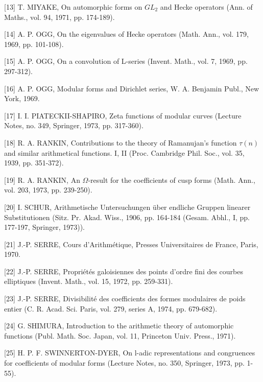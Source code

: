 \documentclass[10pt,oneside]{article}
\begin{document}
[13] T. MIYAKE, On automorphic forms on \(GL_2\) and Hecke operators (Ann. of Maths., vol. 94, 1971, pp. 174-189).\par

[14] A. P. OGG, On the eigenvalues of Hecke operators (Math. Ann., vol. 179, 1969, pp. 101-108).\par

[15] A. P. OGG, On a convolution of L-series (Invent. Math., vol. 7, 1969, pp. 297-312).\par

[16] A. P. OGG, Modular forms and Dirichlet series, W. A. Benjamin Publ., New York, 1969.\par

[17] I. I. PIATECKII-SHAPIRO, Zeta functions of modular curves (Lecture Notes, no. 349, Springer, 1973, pp. 317-360).\par

[18] R. A. RANKIN, Contributions to the theory of Ramanujan's function \(\tau(n)\) and similar arithmetical functions. I, II (Proc. Cambridge Phil. Soc., vol. 35, 1939, pp. 351-372).\par

[19] R. A. RANKIN, An \(\Omega\)-result for the coefficients of cusp forms (Math. Ann., vol. 203, 1973, pp. 239-250).\par

[20] I. SCHUR, Arithmetische Untersuchungen über endliche Gruppen linearer Substitutionen (Sitz. Pr. Akad. Wiss., 1906, pp. 164-184 (Gesam. Abhl., I, pp. 177-197, Springer, 1973)).\par

[21] J.-P. SERRE, Cours d'Arithmétique, Presses Universitaires de France, Paris, 1970.\par

[22] J.-P. SERRE, Propriétés galoisiennes des points d'ordre fini des courbes elliptiques (Invent. Math., vol. 15, 1972, pp. 259-331).\par

[23] J.-P. SERRE, Divisibilité des coefficients des formes modulaires de poids entier (C. R. Acad. Sci. Paris, vol. 279, series A, 1974, pp. 679-682).\par

[24] G. SHIMURA, Introduction to the arithmetic theory of automorphic functions (Publ. Math. Soc. Japan, vol. 11, Princeton Univ. Press., 1971).\par

[25] H. P. F. SWINNERTON-DYER, On l-adic representations and congruences for coefficients of modular forms (Lecture Notes, no. 350, Springer, 1973, pp. 1-55).\par
\end{document}

